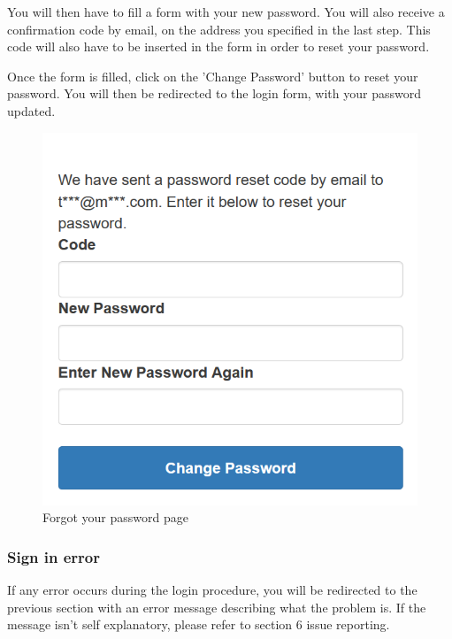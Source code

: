 You will then have to fill a form with your new password. You will also receive a confirmation code by email, on the address you specified in the last step. This code will also have to be inserted in the form in order to reset your password.

Once the form is filled, click on the 'Change Password' button to reset your password. You will then be redirected to the login form, with your password updated.

\begin{figure}[H]
\centering
\includegraphics[scale=0.6]{res/Immagini/ResetPasswordForm}
\caption{Forgot your password page}
\end{figure}

\subsubsection{Sign in error}
If any error occurs during the login procedure, you will be redirected to the previous section with an error message describing what the problem is. If the message isn't self explanatory, please refer to section 6 issue reporting.


